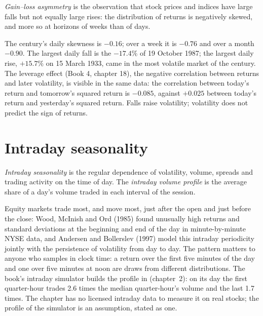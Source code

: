 \begin{definition}\label{def:rs:stylised-facts-of-returns:gainloss}
\emph{Gain--loss asymmetry} is the observation that stock prices and indices have large falls but not
equally large rises: the distribution of returns is negatively skewed, and more so at horizons of weeks than of days.
\end{definition}

The century's daily skewness is $-0.16$; over a week it is $-0.76$ and over a month $-0.90$. The largest daily fall is the $-17.4\%$
of 19 October 1987; the largest daily rise, $+15.7\%$ on 15 March 1933, came in the most volatile market of the century. The leverage
effect (Book 4, chapter 18), the negative correlation between returns and later volatility, is visible in the same data: the
correlation between today's return and tomorrow's squared return is $-0.085$, against $+0.025$ between today's return and
yesterday's squared return. Falls raise volatility; volatility does not predict the sign of returns.

\section{Intraday seasonality}

\begin{definition}\label{def:rs:stylised-facts-of-returns:intraday}
\emph{Intraday seasonality} is the regular dependence of volatility, volume, spreads and trading
activity on the time of day. The \emph{intraday volume profile} is the average share of a day's
volume traded in each interval of the session.
\end{definition}

Equity markets trade most, and move most, just after the open and just before the close: Wood, McInish and Ord (1985) found
unusually high returns and standard deviations at the beginning and end of the day in minute-by-minute NYSE data, and Andersen and
Bollerslev (1997) model this intraday periodicity jointly with the persistence of volatility from day to day. The pattern matters to anyone who samples in clock time: a return over the first five minutes of the day and one over five
minutes at noon are draws from different distributions. The book's intraday simulator builds the profile in (chapter~2): on its day
the first quarter-hour trades 2.6 times the median quarter-hour's volume and the last 1.7 times. The chapter has no licensed intraday
data to measure it on real stocks; the profile of the simulator is an assumption, stated as one.

